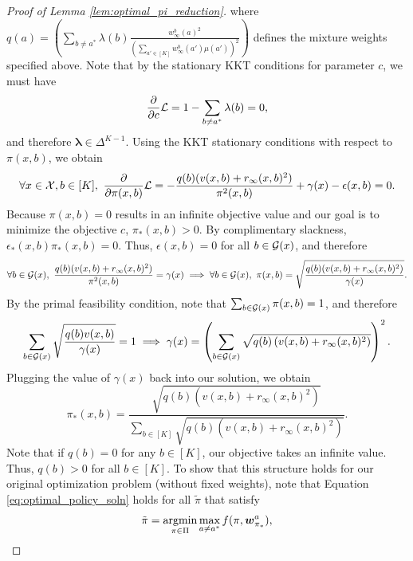 \documentclass{article}
\begin{document}
\begin{appendices}
\begin{proof}[Proof of Lemma \ref{lem:optimal_pi_reduction}]
    where $q(a) = \left(\sum_{b \neq a^*}\lambda(b) \frac{w_\infty^b(a)^2}{\left(\sum_{a' \in [K]} w_\infty^b(a')\mu(a') \right)^2}\right)$ defines the mixture weights specified above. Note that by the stationary KKT conditions for parameter $c$, we must have
    \begin{equation}
        \frac{\partial}{\partial c} \mathcal{L} = 1-\sum_{b\neq a^*} \lambda(b)= 0,
    \end{equation}
    and therefore $\bm{\lambda} \in \Delta^{K-1}$. Using the KKT stationary conditions with respect to $\pi(x,b)$, we obtain
    \begin{equation}
        \forall x\in \Xcal, b\in [K], \ \frac{\partial}{\partial \pi(x,b)} \Lcal = -\frac{q(b) (v(x,b) + r_\infty(x,b)^2)}{\pi^2(x,b)} + \gamma(x) - \epsilon(x,b) = 0.
    \end{equation}
    Because $\pi(x,b) = 0$ results in an infinite objective value and our goal is to minimize the objective $c$, $\pi_*(x,b) > 0$. By complimentary slackness, $\epsilon_*(x,b)\pi_*(x,b) = 0$. Thus, $\epsilon(x,b) = 0$ for all $b \in \mathcal{G}(x)$, and therefore 
    \begin{equation}
        \forall b \in \mathcal{G}(x), \ \frac{q(b) (v(x,b) + r_\infty(x,b)^2)}{\pi^2(x,b)} =  \gamma(x) \implies \forall b \in \mathcal{G}(x), \ \pi(x,b) = \sqrt{\frac{q(b)(v(x,b) + r_\infty(x,b)^2) }{\gamma(x)}}.
    \end{equation}
    By the primal feasibility condition, note that $\sum_{b \in \mathcal{G}(x)} \pi(x,b) = 1$, and therefore 
    \begin{equation}
        \sum_{b \in \mathcal{G}(x)}\sqrt\frac{q(b) v(x,b)}{\gamma(x)} = 1 \implies  \gamma(x) = \left(\sum_{b \in \mathcal{G}(x)} \sqrt{q(b)\left(v(x,b) + r_\infty(x,b)^2\right) }\right)^2. 
    \end{equation}
    Plugging the value of $\gamma(x)$ back into our solution, we obtain 
    \begin{equation}\label{eq:optimal_policy_soln}
        \pi_*(x,b) = \frac{\sqrt{q(b)(v(x,b) + r_\infty(x,b)^2)}}{\sum_{b \in [K]} \sqrt{q(b)(v(x,b)+ r_\infty(x,b)^2)}}. 
    \end{equation}
    Note that if $q(b) = 0$ for any $b \in [K]$, our objective takes an infinite value. Thus, $q(b) >0$ for all $b \in [K]$. To show that this structure holds for our original optimization problem (without fixed weights), note that Equation \eqref{eq:optimal_policy_soln} holds for all $\tilde\pi$ that satisfy  
    \begin{equation}
        \tilde\pi = \argmin_{\pi \in \Pi} \max_{a\neq a^*} f(\pi, \bm{w}_{\pi_*}^a),

\end{equation}
\end{proof}
\end{appendices}
\end{document}
